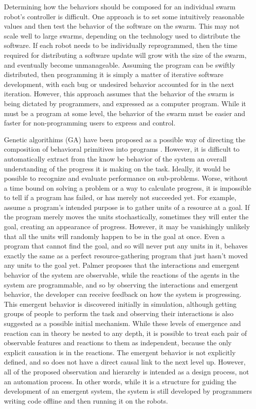 \documentclass[]{article}
\begin{document}
Determining how the behaviors should be composed for an individual swarm robot's controller is difficult. 
One approach is to set some intuitively reasonable values and then test the behavior of the software on the swarm. 
This may not scale well to large swarms, depending on the technology used to distribute the software. 
If each robot needs to be individually reprogrammed, then the time required for distributing a software update will grow with the size of the swarm, and eventually become unmanageable. 
Assuming the program can be swiftly distributed, then programming it is simply a matter of iterative software development, with each bug or undesired behavior accounted for in the next iteration. 
However, this approach assumes that the behavior of the swarm is being dictated by programmers, and expressed as a computer program. 
While it must be a program at some level, the behavior of the swarm must be easier and faster for non-programming users to express and control. 

Genetic algorithims (GA) have been proposed as a possible way of directing the composition of behavioral primitives into programs \cite{palmer2005emergence}.
However, it is difficult to automatically extract from the know be behavior of the system an overall understanding of the progress it is making on the task. 
Ideally, it would be possible to recognize and evaluate performance on sub-problems. 
Worse, without a time bound on solving a problem or a way to calculate progress, it is impossible to tell if a program has failed, or has merely not succeeded yet.
For example, assume a program's intended purpose is to gather units of a resource at a goal. 
If the program merely moves the units stochastically, sometimes they will enter the goal, creating an appearance of progress. 
However, it may be vanishingly unlikely that all the units will randomly happen to be in the goal at once. 
Even a program that cannot find the goal, and so will never put any units in it, behaves exactly the same as a perfect resource-gathering program that just hasn't moved any units to the goal yet. 
Palmer proposes that the interactions and emergent behavior of the system are observable, while the reactions of the agents in the system are programmable, and so by observing the interactions and emergent behavior, the developer can receive feedback on how the system is progressing. 
This emergent behavior is discovered initially in simulation, although getting groups of people to perform the task and observing their interactions is also suggested as a possible initial mechanism.
While these levels of emergence and reaction can in theory be nested to any depth, it is possible to treat each pair of observable features and reactions to them as independent, because the only explicit causation is in the reactions. 
The emergent behavior is not explicitly defined, and so does not have a direct causal link to the next level up. 
However, all of the proposed observation and hierarchy is intended as a design process, not an automation process. 
In other words, while it is a structure for guiding the development of an emergent system, the system is still developed by programmers writing code offline and then running it on the robots.
\end{document}

